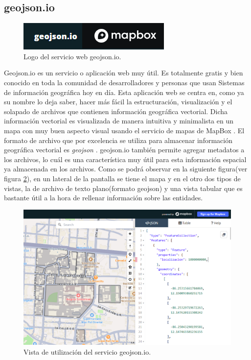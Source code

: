 \subsection{geojson.io}
\begin{figure}[h]
    \centering
    \includegraphics[scale=1.5]{Graphics/geojson.io_logo.png}
    \caption{Logo del servicio web geojson.io.}
    \label{fig:figura3}
\end{figure}
Geojson.io \cite{geojson.io} es un servicio o aplicación web muy útil. Es totalmente gratis y bien conocido en toda la comunidad
de desarrolladores y personas que usan Sistemas de información geográfica hoy en día.
Esta aplicación web se centra en, como ya su
nombre lo deja saber, hacer más fácil la estructuración, visualización y el solapado de archivos que contienen información geográfica vectorial.
Dicha información vectorial es visualizada de manera intuitiva y minimalista en un mapa con muy buen aspecto visual usando el servicio
de mapas de MapBox \cite{mapbox}. El formato de archivo que por excelencia se utiliza para almacenar información geográfica vectorial es \textit{geojson} \cite{geojsonOfficialPage}.
geojson.io también permite agregar metadatos a los archivos, lo cuál es una característica muy útil para esta información espacial ya almacenada en los archivos.
Como se podrá observar en la siguiente figura(ver figura \ref{fig:figura4}), en un lateral de la pantalla se tiene el mapa y en el otro dos tipos de vistas, la de archivo de texto plano(formato geojson)
y una vista tabular que es bastante útil a la hora de rellenar información sobre las entidades.
\begin{figure}[h]
    \centering
    \includegraphics[scale=0.5]{Graphics/geojson.io_description.png}
    \caption{Vista de utilización del servicio geojson.io.}
    \label{fig:figura4}
\end{figure}
